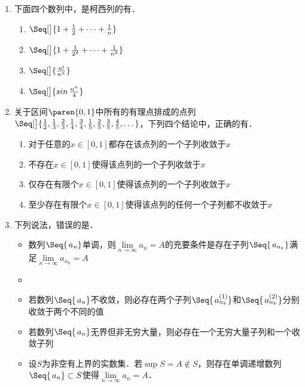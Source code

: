 \begin{enumerate}
\item 下面四个数列中，是柯西列的有\uline{}．
  \begin{enumerate}
    \renewcommand{\labelenumii}{\enumparen{\arabic{enumii}}}
  \item \(\Seq[\big]{1 + \frac12 + \dots + \frac1n}\)
  \item \(\Seq[\big]{1 + \frac1{2^2} + \dots + \frac1{n^2}}\)
  \item \(\Seq[\big]{\frac{n!}{n^n}}\)
  \item \(\Seq[\big]{\sin\frac{n^n}{4}}\) %
  \end{enumerate}

\item 关于区间\(\paren{0,1}\)中所有的有理点排成的点列\(\Seq[\big]{\frac12, \frac13, \frac23, \frac14, \frac34, \frac15, \frac25, \frac35, \frac45, \dots}\)，下列四个结论中，正确的有\uline{}．
  \begin{enumerate}
    \renewcommand{\labelenumii}{\enumparen{\arabic{enumii}}}
  \item 对于任意的\(x \in [0,1]\)都存在该点列的一个子列收敛于\(x\)
  \item 不存在\(x \in [0,1]\)使得该点列的一个子列收敛于\(x\)
  \item 仅存在有限个\(x \in [0,1]\)使得该点列的一个子列收敛于\(x\)
  \item 至少存在有限个\(x \in [0,1]\)使得该点列的任何一个子列都不收敛于\(x\)
  \end{enumerate}

\item 下列说法，错误的是\uline{\makebox[6em]{}}．
  \begin{itemize}
    \renewcommand{\labelitemi}{\faCircleThin}
  \item 数列\(\Seq{\,a_n}\)单调，则\(\lim\limits_{n\to\infty} a_n = A\)的充要条件是存在子列\(\Seq{\,a_{n_k}}\)满足\(\lim\limits_{n\to\infty} a_{n_k} = A\)
    \ifshowsol
    \item[\faCircle]
    \else
    \item
    \fi
    若数列\(\Seq{\,a_n}\)不收敛，则必存在两个子列\(\Seq{\,a_{n_k}^{(1)}}\)和\(\Seq{\,a_{n_k}^{(2)}}\)分别收敛于两个不同的值
  \item 若数列\(\Seq{\,a_n}\)无界但非无穷大量，则必存在一个无穷大量子列和一个收敛子列
  \item 设\(S\)为非空有上界的实数集．若\(\sup S = A \notin S\)，则存在单调递增数列\(\Seq{\,a_n} \subset S\)使得\(\lim\limits_{n\to\infty} a_n = A\)．
  \end{itemize}
\end{enumerate}
\fi


